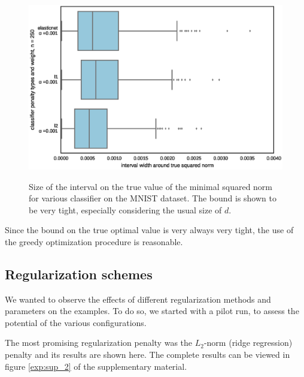 \documentclass{article} %
\begin{document}
\begin{figure}[h!]
\begin{center}
\includegraphics[scale=0.65]{figs/experiment_1}
\label{res:exp1}
\caption{\small Size of the interval on the true value of the minimal squared norm for various
                classifier on the MNIST dataset. The bound is shown to be very tight, especially considering the usual size of $d$.}
\end{center}
\end{figure}

Since the bound on the true optimal value is very always very tight, the use of
the greedy optimization procedure is reasonable.


\subsection{Regularization schemes}

We wanted to observe the effects of different regularization methods and parameters on the examples. To do so, we started with
a pilot run, to assess the potential of the various configurations.

The most promising regularization penalty was the $L_2$-norm (ridge
regression) penalty and its results are shown here. 
The complete results can be viewed in figure \ref{exp:sup_2} of the supplementary material.
\end{document}
